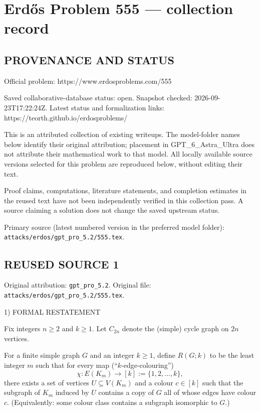 \section*{Erd\H{o}s Problem 555 --- collection record}

\subsection*{PROVENANCE AND STATUS}
Official problem: https://www.erdosproblems.com/555

Saved collaborative-database status: open.
Snapshot checked: 2026-09-23T17:22:24Z.
Latest status and formalization links: https://teorth.github.io/erdosproblems/

This is an attributed collection of existing writeups. The model-folder names below identify their original attribution; placement in GPT\_6\_Astra\_Ultra does not attribute their mathematical work to that model. All locally available source versions selected for this problem are reproduced below, without editing their text.

Proof claims, computations, literature statements, and completion estimates in the reused text have not been independently verified in this collection pass. A source claiming a solution does not change the saved upstream status.

Primary source (latest numbered version in the preferred model folder): \texttt{attacks/erdos/gpt\_pro\_5.2/555.tex}.

\subsection*{REUSED SOURCE 1}
Original attribution: \texttt{gpt\_pro\_5.2}.
Original file: \texttt{attacks/erdos/gpt\_pro\_5.2/555.tex}.


1) FORMAL RESTATEMENT

Fix integers $n\ge 2$ and $k\ge 1$. Let $C_{2n}$ denote the (simple) cycle graph on $2n$ vertices.

For a finite simple graph $G$ and an integer $k\ge 1$, define $R(G;k)$ to be the least integer $m$ such that for every map (``$k$-edge-colouring'')
\[
\chi:E(K_m)\to [k]:=\{1,2,\dots,k\},
\]
there exists a set of vertices $U\subseteq V(K_m)$ and a colour $c\in [k]$ such that the subgraph of $K_m$ induced by $U$ contains a copy of $G$ all of whose edges have colour $c$.
(Equivalently: some colour class contains a subgraph isomorphic to $G$.)

